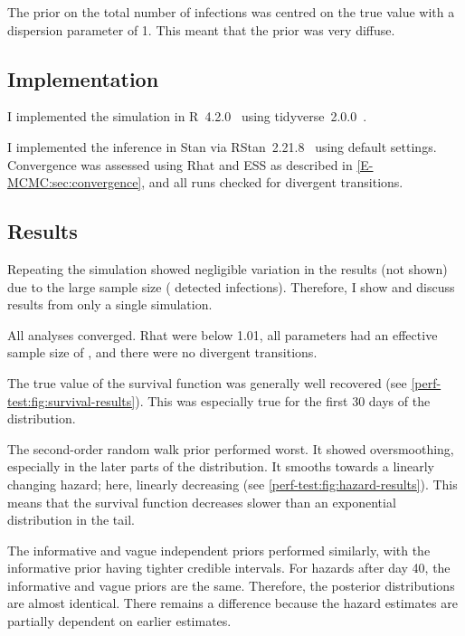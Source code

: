 \documentclass[thesis.tex]{subfiles}
\begin{document}
The prior on the total number of infections was centred on the true value with a dispersion parameter of 1.
This meant that the prior was very diffuse.

\subsection{Implementation}

I implemented the simulation in R~4.2.0~\autocite{R-4-2-0} using tidyverse~2.0.0~\autocite{tidyverse}.

I implemented the inference in Stan via RStan~2.21.8~\autocite{rstan2-21-8} using default settings.
Convergence was assessed using Rhat and ESS as described in \cref{E-MCMC:sec:convergence}, and all runs checked for divergent transitions.


\subsection{Results} \label{perf-test:sec:results}

Repeating the simulation showed negligible variation in the results (not shown) due to the large sample size ( detected infections).
Therefore, I show and discuss results from only a single simulation.

All analyses converged.
Rhat were below 1.01, all parameters had an effective sample size of , and there were no divergent transitions.

The true value of the survival function was generally well recovered (see \cref{perf-test:fig:survival-results}).
This was especially true for the first 30 days of the distribution.

The second-order random walk prior performed worst.
It showed oversmoothing, especially in the later parts of the distribution.
It smooths towards a linearly changing hazard; here, linearly decreasing (see \cref{perf-test:fig:hazard-results}).
This means that the survival function decreases slower than an exponential distribution in the tail.

The informative and vague independent priors performed similarly, with the informative prior having tighter credible intervals.
For hazards after day 40, the informative and vague priors are the same.
Therefore, the posterior distributions are almost identical.
There remains a difference because the hazard estimates are partially dependent on earlier estimates.
\end{document}
